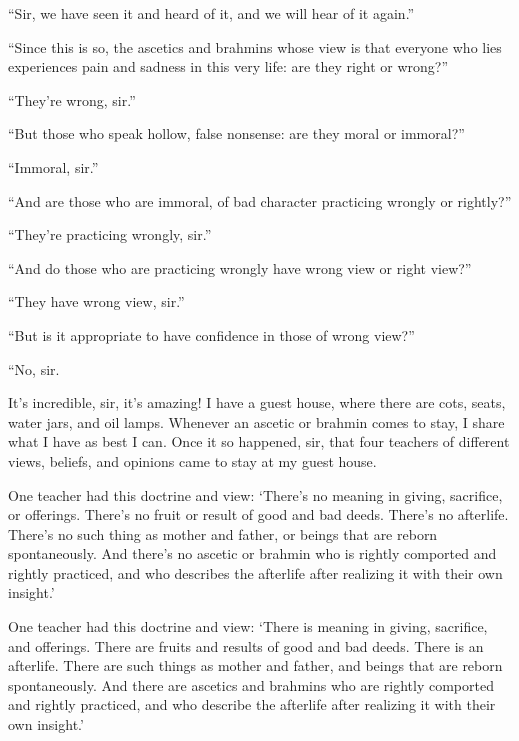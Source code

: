 \documentclass[12pt,openany]{book}%
\begin{document}
“Sir, we have seen it and heard of it, and we will hear of it again.” 

“Since this is so, the ascetics and brahmins whose view is that everyone who lies experiences pain and sadness in this very life: are they right or wrong?” 

“They’re wrong, sir.” 

“But those who speak hollow, false nonsense: are they moral or immoral?” 

“Immoral, sir.” 

“And are those who are immoral, of bad character practicing wrongly or rightly?” 

“They’re practicing wrongly, sir.” 

“And do those who are practicing wrongly have wrong view or right view?” 

“They have wrong view, sir.” 

“But is it appropriate to have confidence in those of wrong view?” 

“No, sir. 

It’s incredible, sir, it’s amazing! I have a guest house, where there are cots, seats, water jars, and oil lamps. Whenever an ascetic or brahmin comes to stay, I share what I have as best I can. Once it so happened, sir, that four teachers of different views, beliefs, and opinions came to stay at my guest house. 

One teacher had this doctrine and view: ‘There’s no meaning in giving, sacrifice, or offerings. There’s no fruit or result of good and bad deeds. There’s no afterlife. There’s no such thing as mother and father, or beings that are reborn spontaneously. And there’s no ascetic or brahmin who is rightly comported and rightly practiced, and who describes the afterlife after realizing it with their own insight.’ 

One teacher had this doctrine and view: ‘There is meaning in giving, sacrifice, and offerings. There are fruits and results of good and bad deeds. There is an afterlife. There are such things as mother and father, and beings that are reborn spontaneously. And there are ascetics and brahmins who are rightly comported and rightly practiced, and who describe the afterlife after realizing it with their own insight.’ 
\end{document}

